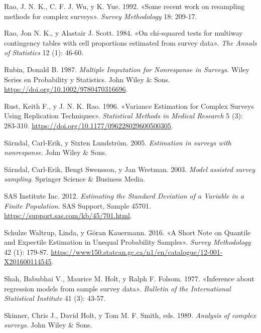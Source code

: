 \documentclass[
  spanish,
  11pt,
  letterpaper,
  oneside,
  open=any]{scrbook}
\newlength{\cslhangindent}
\newenvironment{CSLReferences}[2] %
 {\begin{list}{}{%
  \setlength{\itemindent}{0pt}
  \setlength{\leftmargin}{0pt}
  \setlength{\parsep}{0pt}
  \ifodd #1
   \setlength{\leftmargin}{\cslhangindent}
   \setlength{\itemindent}{-1\cslhangindent}
  \fi
  \setlength{\itemsep}{#2\baselineskip}}}
 {\end{list}}
\begin{document}
\begin{CSLReferences}{1}{1}
Rao, J. N. K., C. F. J. Wu, y K. Yue. 1992. {«Some recent work on
resampling methods for complex surveys»}. \emph{Survey Methodology} 18:
209-17.

Rao, Jon N. K., y Alastair J. Scott. 1984. {«On chi-squared tests for
multiway contingency tables with cell proportions estimated from survey
data»}. \emph{The Annals of Statistics} 12 (1): 46-60.

Rubin, Donald B. 1987. \emph{Multiple Imputation for Nonresponse in
Surveys}. Wiley Series en Probability y Statistics. John Wiley \& Sons.
\url{https://doi.org/10.1002/9780470316696}.

Rust, Keith F., y J. N. K. Rao. 1996. {«Variance Estimation for Complex
Surveys Using Replication Techniques»}. \emph{Statistical Methods in
Medical Research} 5 (3): 283-310.
\url{https://doi.org/10.1177/096228029600500305}.

Särndal, Carl-Erik, y Sixten Lundström. 2005. \emph{Estimation in
surveys with nonresponse}. John Wiley \& Sons.

Särndal, Carl-Erik, Bengt Swensson, y Jan Wretman. 2003. \emph{Model
assisted survey sampling}. Springer Science \& Business Media.

SAS Institute Inc. 2012. \emph{Estimating the Standard Deviation of a
Variable in a Finite Population}. SAS Support, Sample 45701.
\url{https://support.sas.com/kb/45/701.html}.

Schulze Waltrup, Linda, y Göran Kauermann. 2016. {«A Short Note on
Quantile and Expectile Estimation in Unequal Probability Samples»}.
\emph{Survey Methodology} 42 (1): 179-87.
\url{https://www150.statcan.gc.ca/n1/en/catalogue/12-001-X201600114545}.

Shah, Babubhai V., Maurice M. Holt, y Ralph F. Folsom. 1977. {«Inference
about regression models from sample survey data»}. \emph{Bulletin of the
International Statistical Institute} 41 (3): 43-57.

Skinner, Chris J., David Holt, y Tom M. F. Smith, eds. 1989.
\emph{Analysis of complex surveys}. John Wiley \& Sons.


\end{CSLReferences}
\end{document}
